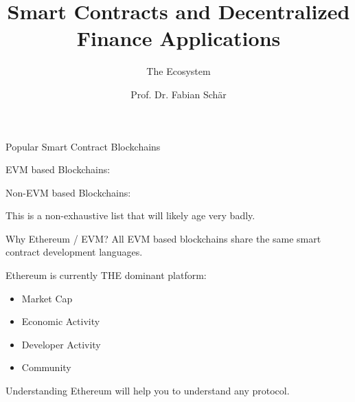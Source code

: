 \documentclass[]{beamer}
\title{Smart Contracts and Decentralized Finance Applications}
\subtitle{The Ecosystem}
\author{Prof. Dr. Fabian Schär}
\institute{University of Basel}
\begin{document}
\thispagestyle{empty}
\begin{frame}[noframenumbering]
	\titlepage
\end{frame}

\begin{frame}{Popular Smart Contract Blockchains}

EVM based Blockchains:

\vspace{0.2em}

\begin{center}
\begin{tikzpicture}[scale=1, every node/.style={scale=1}]
	
\end{tikzpicture}
\end{center}

\vspace{1em}



Non-EVM based Blockchains:

\vspace{0.2em}

\begin{center}
\begin{tikzpicture}[scale=1, every node/.style={scale=1}]
	
\end{tikzpicture}
\end{center}

\vspace{1em}
This is a non-exhaustive list that will likely age very badly.

\end{frame}

\begin{frame}{Why Ethereum / EVM?}
	All EVM based blockchains share the same smart contract development languages.
	
	\vspace{1 em}
	
	Ethereum is currently THE dominant platform:
	\begin{itemize}
		\item Market Cap
		\item Economic Activity
		\item Developer Activity
		\item Community
	\end{itemize}
	\vspace{1 em}
	Understanding Ethereum will help you to understand any protocol.
\end{frame}
\end{document}
